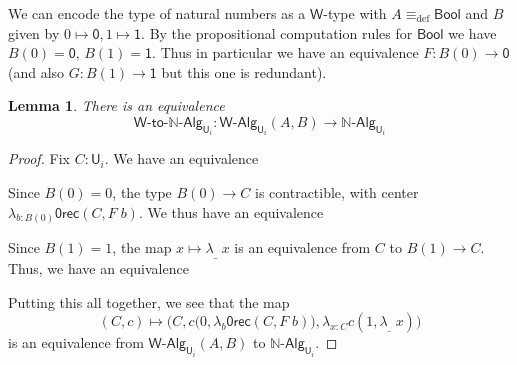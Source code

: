 \documentclass[reqno,10pt,a4paper,oneside]{amsart}
\numberwithin{equation}{section}
\theoremstyle{mythm}
\newtheorem{lemma}[theorem]{Lemma}
\theoremstyle{mydef}
\theoremstyle{myrmk}
\newcommand{\deq}{\equiv}
\newcommand{\defeq}{\deq_{\mathrm{def}}}
\newcommand{\prd}[1]{\Pi_{#1}}
\newcommand{\lam}[1]{\lambda_{#1}}
\newcommand{\abort}{\mathsf{0rec}}
\newcommand{\nat}{\ensuremath{\mathbb{N}}}
\newcommand{\W}{\mathsf{W}}
\newcommand{\Bool}{\mathsf{Bool}}
\newcommand{\one}{\mathsf{1}}
\newcommand{\zero}{\mathsf{0}}
\newcommand{\UU}{\mathsf{U}}
\newcommand{\NatAlg}{\nat\text{-}\mathsf{Alg}}
\newcommand{\WAlgToNatAlg}{\W\text{-}\mathsf{to}\text{-}\nat\text{-}\mathsf{Alg}}
\newcommand{\WAlg}{\mathsf{W}\text{-}\mathsf{Alg}}
\begin{document}
We can encode the type of natural numbers as a $\W$-type with $A \defeq \Bool$ and $B$ given by $0 \mapsto \zero, 1 \mapsto \one$. By the propositional computation rules for $\Bool$ we have $B(0) = \zero$, $B(1) = \one$. Thus in particular we have an equivalence $F : B(0) \to \zero$ (and also $G : B(1) \to \one$ but this one is redundant).
\begin{lemma}
There is an equivalence
\[ \WAlgToNatAlg_{\UU_i} : \WAlg_{\UU_i}(A,B) \to \NatAlg_{\UU_i} \]
\end{lemma}
\begin{proof}
Fix $C : \UU_i$. We have an equivalence
\begin{center}
\end{center}
Since $B(0) = 0$, the type $B(0) \to C$ is contractible, with center $\lam{b:B(0)} \abort(C,F \; b)$. We thus have an equivalence
\begin{center}
\end{center}
Since $B(1) = 1$, the map $x \mapsto \lam{\_}\; x$ is an equivalence from $C$ to $B(1) \to C$. Thus, we have an equivalence
\begin{center}
\end{center}
Putting this all together, we see that the map 
\[ (C,c) \mapsto \Big(C,c\big(0,\lam{b} \abort(C,F \; b)\big),\lam{x:C} c(1, \lam{\_} \; x)\Big)\] 
is an equivalence from $\WAlg_{\UU_i}(A,B)$ to $\NatAlg_{\UU_i}$.
\end{proof}
\end{document}
